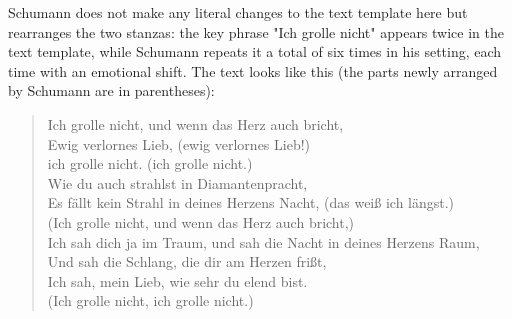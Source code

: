 \documentclass[10pt,a4paper,twocolumn]{rho}
\begin{document}
Schumann does not make any literal changes to the text template here but rearranges the two stanzas: the key phrase "Ich grolle nicht" appears twice in the text template, while Schumann repeats it a total of six times in his setting, each time with an emotional shift. The text looks like this (the parts newly arranged by Schumann are in parentheses):
\begin{quote}
Ich grolle nicht, und wenn das Herz auch bricht,\\  
Ewig verlornes Lieb, (ewig verlornes Lieb!)  \\
ich grolle nicht. (ich grolle nicht.)\\
Wie du auch strahlst in Diamantenpracht,\\
Es fällt kein Strahl in deines Herzens Nacht, (das weiß ich längst.)\\ 
(Ich grolle nicht, und wenn das Herz auch bricht,)\\
Ich sah dich ja im Traum, und sah die Nacht in deines Herzens Raum,\\ 
Und sah die Schlang, die dir am Herzen frißt,  \\
Ich sah, mein Lieb, wie sehr du elend bist.  \\
(Ich grolle nicht, ich grolle nicht.)
\end{quote}
\end{document}
